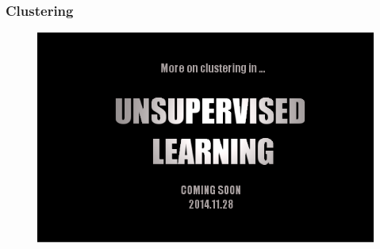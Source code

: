 \documentclass[table]{beamer}
\begin{document}
\frame
{
	\frametitle{Clustering}
	\begin{figure}
		\includegraphics[scale=0.45]{fig/ulcs3.png}		
	\end{figure}
}

\end{document}
